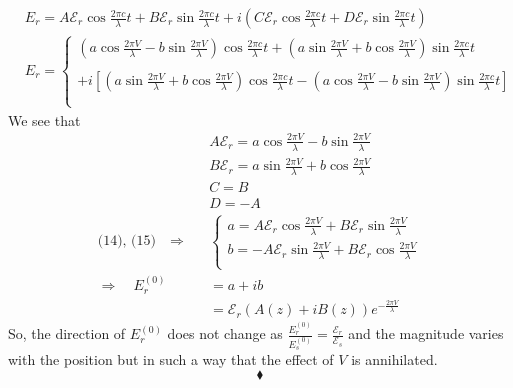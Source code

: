 \begin{align}
&E^{}_r=A\mathcal{E}_r\cos \frac{2\pi c}{\lambda} t + B\mathcal{E}_r\sin \frac{2\pi c}{\lambda} t+i\left(C\mathcal{E}_r\cos \frac{2\pi c}{\lambda}  t + D\mathcal{E}_r\sin \frac{2\pi c}{\lambda}  t \right)\\
&E^{}_r=\left\{\begin{array}{l}\left(a\cos \frac{2\pi V}{\lambda}-b\sin \frac{2\pi V}{\lambda}\right)\cos \frac{2\pi c}{\lambda}t+\left(a\sin \frac{2\pi V}{\lambda}+b\cos \frac{2\pi V}{\lambda}\right)\sin \frac{2\pi c}{\lambda}t\\\\
+i\left[
\left(a\sin \frac{2\pi V}{\lambda}+b\cos \frac{2\pi V}{\lambda}\right)\cos \frac{2\pi c}{\lambda}t-\left(a\cos \frac{2\pi V}{\lambda}-b\sin \frac{2\pi V}{\lambda}\right)\sin \frac{2\pi c}{\lambda}t
\right]\\\\
\end{array}\right.
\end{align}
We see that 
\begin{align}
&A\mathcal{E}_r= a\cos \frac{2\pi V}{\lambda}-b\sin \frac{2\pi V}{\lambda}\\
&B\mathcal{E}_r= a\sin \frac{2\pi V}{\lambda}+b\cos \frac{2\pi V}{\lambda}\\
&C=B\\
&D=-A\\
\text{(14), (15)}\quad\Rightarrow \quad &\left\{\begin{array}{l}a= A\mathcal{E}_r\cos \frac{2\pi V}{\lambda}+B\mathcal{E}_r\sin \frac{2\pi V}{\lambda}\\
b= -A\mathcal{E}_r\sin \frac{2\pi V}{\lambda}+B\mathcal{E}_r\cos \frac{2\pi V}{\lambda}\\
\end{array}\right.\\
\Rightarrow \quad E^{(0)}_r&= a+ib\\
&=\mathcal{E}_r\left(A\left(z\right)+iB\left(z\right)\right)e^{-\frac{2\pi V}{\lambda}}
\end{align}
So, the direction of $E^{(0)}_r$ does not change as $\frac{E^{(0)}_r}{E^{(0)}_s} = \frac{\mathcal{E}_r}{\mathcal{E}_s}$  and the magnitude varies with the position but in such a way that the effect of $V$ is annihilated.
$$\blacklozenge$$
\newpage

